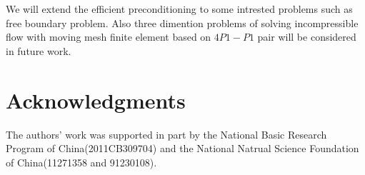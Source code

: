 \documentclass{eajam}
\begin{document}
   We will extend the efficient preconditioning to some intrested 
   problems such as free boundary problem. Also three dimention
   problems of solving incompressible flow with moving mesh finite
   element based on $4P1-P1$ pair will be considered in future work. 

\section*{Acknowledgments}
The authors' work was supported in part by the National Basic Research
Program of China(2011CB309704) and the National Natrual Science
Foundation of China(11271358 and 91230108).
   


\end{document}
